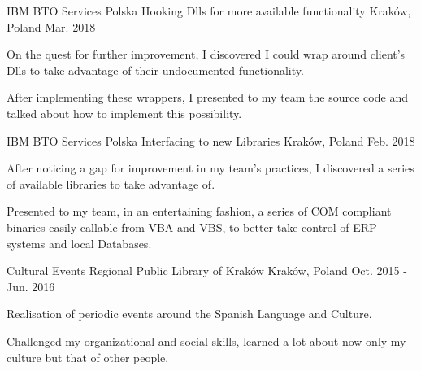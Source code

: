 

\begin{cventries}

  \cventry
    {IBM BTO Services Polska} %
    {Hooking Dlls for more available functionality} %
    {Kraków, Poland} %
    {Mar. 2018} %
    {
      \begin{cvitems} %
        \item {On the quest for further improvement, I discovered I could wrap around client's Dlls to take advantage of their undocumented functionality.} 
        \item {After implementing these wrappers, I presented to my team the source code and talked about how to implement this possibility.} %
      \end{cvitems}
    }

  \cventry
    {IBM BTO Services Polska} %
    {Interfacing to new Libraries} %
    {Kraków, Poland} %
    {Feb. 2018} %
    {
      \begin{cvitems} %
      	\item {After noticing a gap for improvement in my team's practices, I discovered a series of available libraries to take advantage of.}
        \item {Presented to my team, in an entertaining fashion, a series of COM compliant binaries easily callable from VBA and VBS, to better take control of ERP systems and local Databases.}
      \end{cvitems}
    }

\cventry
	{Cultural Events} %
	{Regional Public Library of Kraków} %
	{Kraków, Poland} %
	{Oct. 2015 - Jun. 2016} %
	{
      \begin{cvitems} %
		\item {Realisation of periodic events around the Spanish Language and Culture.}
		\item {Challenged my organizational and social skills, learned a lot about now only my culture but that of other people.}
	  \end{cvitems}
	}

\end{cventries}
